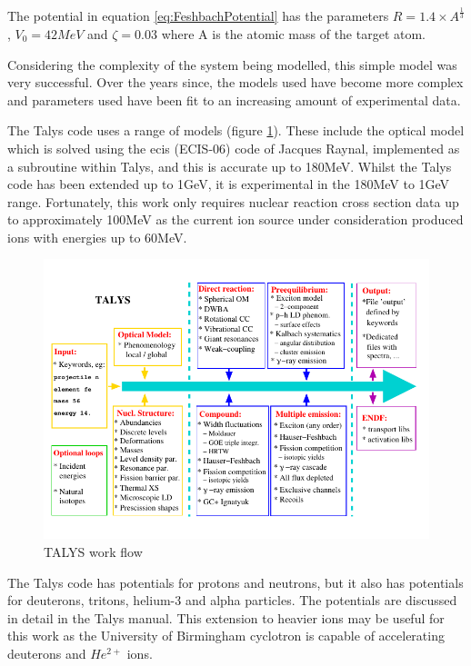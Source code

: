 The potential in equation \ref{eq:FeshbachPotential} has the parameters $R = 1.4 \times A^{\frac{1}{3}}$, $V_0 = 42MeV$ and $\zeta = 0.03$ where A is the atomic mass of the target atom.

Considering the complexity of the system being modelled, this simple model was very successful.  Over the years since, the models used have become more complex and parameters used have been fit to an increasing amount of experimental data.

The Talys code uses a range of models (figure \ref{fig:talysworkflow}).  These include the optical model which is solved using the \acrlong{ecis} (ECIS-06) code of Jacques Raynal, implemented as a subroutine within Talys, and this is accurate up to 180MeV\cite{talysmanual}.  Whilst the Talys code has been extended up to 1GeV, it is experimental in the 180MeV to 1GeV range.  Fortunately, this work only requires nuclear reaction cross section data up to approximately 100MeV as the current ion source under consideration produced ions with energies up to 60MeV.

\begin{figure}[tbp]
  \begin{center}
    \includegraphics[width=.6\linewidth]{chapters/isotope_activation_and_radioactive_decay/images/talys.png}
    \caption{TALYS work flow \cite{talysmanual}}
    \label{fig:talysworkflow}
  \end{center}
\end{figure}

The Talys code has potentials for protons and neutrons, but it also has potentials for deuterons, tritons, helium-3 and alpha particles.  The potentials are discussed in detail in the Talys manual\cite{talysmanual}.  This extension to heavier ions may be useful for this work as the University of Birmingham cyclotron is capable of accelerating deuterons and $He^{2+}$ ions.

